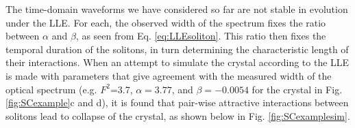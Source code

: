 
The time-domain waveforms we have considered so far are not stable in evolution under the LLE. For each, the observed width of the spectrum fixes the ratio between $\alpha$ and $\beta$, as seen from Eq. \ref{eq:LLEsoliton}. This ratio then fixes the temporal duration of the solitons, in turn determining the characteristic length of their interactions. When an attempt to simulate the crystal according to the LLE is made with parameters that give agreement with the measured width of the optical spectrum (e.g. $F^2$=3.7, $\alpha=3.77$, and $\beta=-0.0054$ for the crystal in Fig. \ref{fig:SCexample}c and d), it is found that pair-wise attractive interactions between solitons lead to collapse of the crystal, as shown below in Fig. \ref{fig:SCexamplesim}.

